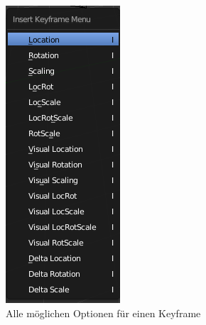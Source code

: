 \begin{figure}[H]
    \centering

    \includegraphics[width=.8\textwidth]{images/animation_keyframes_options.PNG}
    \caption{Alle möglichen Optionen für einen Keyframe}
\end{figure}

